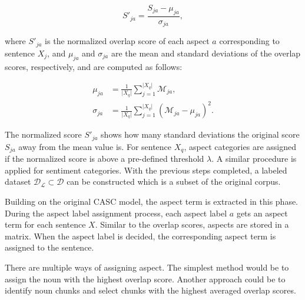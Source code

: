 \documentclass[american, oneside]{ecsgdp}
\begin{document}
\begin{equation}
    S'_{ja} = \frac{S_{ja} - \mu_{ja}}{\sigma_{ja}},
\end{equation}

\noindent where $S'_{ja}$ is the normalized overlap score of each aspect $a$ corresponding to sentence $X_j$, and $\mu_{ja}$ and $\sigma_{ja}$ are the mean and standard deviations of the overlap scores, respectively, and are computed as follows:

\begin{align}
    \mu_{ja}    & = \frac{1}{\lvert X_q \rvert} \sum_{j=1}^{\lvert X_q \rvert} \mathcal{M}_{ja}, \\
    \sigma_{ja} & = \frac{1}{\lvert X_q \rvert} \sum_{j=1}^{\lvert X_q \rvert} \left ( \mathcal{M}_{ja} - \mu_{ja} \right )^2.
\end{align}

The normalized score $S'_{ja}$ shows how many standard deviations the original score $S_{ja}$ away from the mean value is. For sentence $X_q$, aspect categories are assigned if the normalized score is above a pre-defined threshold $\lambda$. 
A similar procedure is applied for sentiment categories. With the previous steps completed, a labeled dataset $\mathcal{D}_\mathcal{L} \subset \mathcal{D}$ can be constructed which is a subset of the original corpus.

\begin{figure}[htbp]
  \centering
  
  \caption{}
  \label{fig:casc2}
\end{figure}

Building on the original CASC model, the aspect term is extracted in this phase. During the aspect label assignment process, each aspect label $a$ gets an aspect term for each sentence $X$. Similar to the overlap scores, aspects are stored in a matrix. When the aspect label is decided, the corresponding aspect term is assigned to the sentence.

There are multiple ways of assigning aspect. The simplest method would be to assign the noun with the highest overlap score. Another approach could be to identify noun chunks \parencite{Honnibal2020Spacy} and select chunks with the highest averaged overlap scores. 

\end{document}
